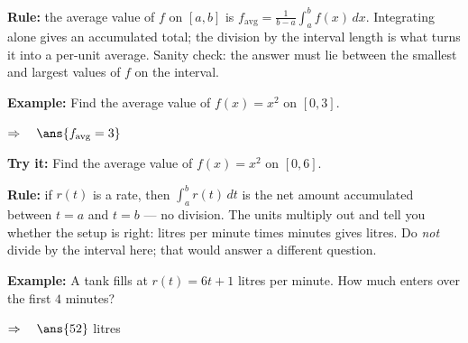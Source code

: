 \documentclass[12pt]{article}
\begin{document}


\begin{formulabox}
\textbf{Rule:} the average value of $f$ on $[a,b]$ is $\displaystyle f_{\text{avg}} = \frac{1}{b-a}\int_a^b f(x)\,dx$. Integrating alone gives an accumulated total; the division by the interval length is what turns it into a per-unit average. Sanity check: the answer must lie between the smallest and largest values of $f$ on the interval.
\end{formulabox}

\begin{examplebox}
\textbf{Example:} \quad Find the average value of $f(x) = x^2$ on $[0,3]$.

$\Rightarrow\quad \ans{f_{\text{avg}} = 3}$
\end{examplebox}

\begin{tryitbox}
\textbf{Try it:} \quad Find the average value of $f(x) = x^2$ on $[0,6]$.\\[2pt]
\end{tryitbox}


\begin{formulabox}
\textbf{Rule:} if $r(t)$ is a rate, then $\displaystyle\int_a^b r(t)\,dt$ is the net amount accumulated between $t=a$ and $t=b$ --- no division. The units multiply out and tell you whether the setup is right: litres per minute times minutes gives litres. Do \emph{not} divide by the interval here; that would answer a different question.
\end{formulabox}

\begin{examplebox}
\textbf{Example:} \quad A tank fills at $r(t) = 6t + 1$ litres per minute. How much enters over the first $4$ minutes?

$\Rightarrow\quad \ans{52}$ litres
\end{examplebox}
\end{document}

